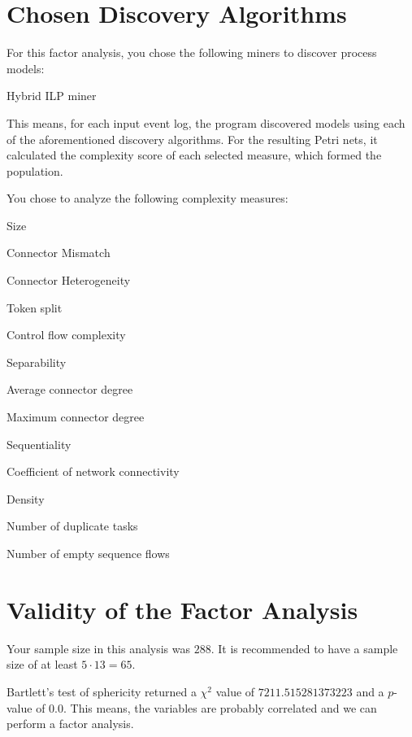 \documentclass[a4paper]{article}
\begin{document}
\section*{Chosen Discovery Algorithms}
For this factor analysis, you chose the following miners to discover process models:
\begin{compactitem}
\item Hybrid ILP miner
\end{compactitem}

This means, for each input event log, the program discovered models using each of the aforementioned discovery algorithms.
For the resulting Petri nets, it calculated the complexity score of each selected measure, which formed the population.

You chose to analyze the following complexity measures:
\begin{compactitem}
\item Size
\item Connector Mismatch
\item Connector Heterogeneity
\item Token split
\item Control flow complexity
\item Separability
\item Average connector degree
\item Maximum connector degree
\item Sequentiality
\item Coefficient of network connectivity
\item Density
\item Number of duplicate tasks
\item Number of empty sequence flows
\end{compactitem}

\section*{Validity of the Factor Analysis}
Your sample size in this analysis was $288$.
It is recommended to have a sample size of at least $5 \cdot 13 = 65$.

Bartlett's test of sphericity returned a $\chi^2$ value of $7211.515281373223$ and a $p$-value of $0.0$.
This means, the variables are probably correlated and we can perform a factor analysis.
\end{document}
